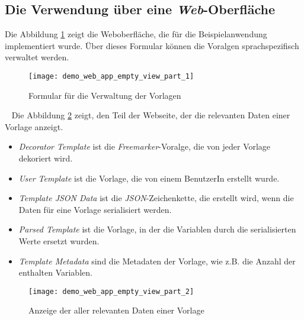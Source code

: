 \subsection{Die Verwendung über eine \emph{Web}-Oberfläche}
Die Abbildung \ref{fig:demo_web_app_empty_view_part_1} zeigt die Weboberfläche, die für die Beispielanwendung implementiert wurde. Über dieses Formular können die Voralgen sprachspezifisch verwaltet werden.
\ \begin{figure}[h]
\centering
\texttt{[image: demo\_web\_app\_empty\_view\_part\_1]}
\caption{Formular für die Verwaltung der Vorlagen}
\label{fig:demo_web_app_empty_view_part_1}
\end{figure}
\ \newline
Die Abbildung \ref{fig:demo_web_app_empty_view_part_2} zeigt, den Teil der Webseite, der die relevanten Daten einer Vorlage anzeigt.
\begin{itemize}
	\item\emph{Decorator Template} ist die \emph{Freemarker}-Voralge, die von jeder Vorlage dekoriert wird.
	\item\emph{User Template} ist die Vorlage, die von einem BenutzerIn erstellt wurde.
	\item\emph{Template JSON Data} ist die \emph{JSON}-Zeichenkette, die erstellt wird, wenn die Daten für eine Vorlage serialisiert werden.
	\item\emph{Parsed Template} ist die Vorlage, in der die Variablen durch die serialisierten Werte ersetzt wurden.
	\item\emph{Template Metadata} sind die Metadaten der Vorlage, wie z.B. die Anzahl der enthalten Variablen.
\end{itemize}
\begin{figure}[h]
\centering
\texttt{[image: demo\_web\_app\_empty\_view\_part\_2]}
\caption{Anzeige der aller relevanten Daten einer Vorlage}
\label{fig:demo_web_app_empty_view_part_2}
\end{figure}

